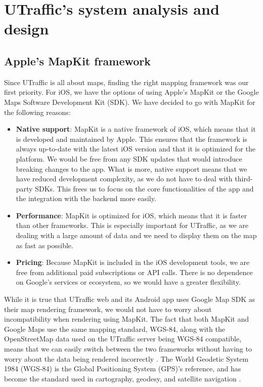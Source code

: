 \section{UTraffic's system analysis and design}

\subsection{Apple's MapKit framework}

Since UTraffic is all about maps, finding the right mapping framework was our first priority. For iOS, we have the options of using Apple's MapKit or the Google Maps Software Development Kit (SDK). We have decided to go with MapKit for the following reasons:

\begin{itemize}
    \item \textbf{Native support}: MapKit is a native framework of iOS, which means that it is developed and maintained by Apple. This ensures that the framework is always up-to-date with the latest iOS version and that it is optimized for the platform. We would be free from any SDK updates that would introduce breaking changes to the app. What is more, native support means that we have reduced development complexity, as we do not have to deal with third-party SDKs. This frees us to focus on the core functionalities of the app and the integration with the backend more easily.
    \item \textbf{Performance}: MapKit is optimized for iOS, which means that it is faster than other frameworks. This is especially important for UTraffic, as we are dealing with a large amount of data and we need to display them on the map as fast as possible.
    \item \textbf{Pricing}: Because MapKit is included in the iOS development tools, we are free from additional paid subscriptions or API calls. There is no dependence on Google's services or ecosystem, so we would have a greater flexibility.
\end{itemize}

While it is true that UTraffic web and its Android app uses Google Map SDK as their map rendering framework, we would not have to worry about incompatibility when rendering using MapKit. The fact that both MapKit and Google Maps use the same mapping standard, WGS-84, along with the OpenStreetMap data used on the UTraffic server being WGS-84 compatible, means that we can easily switch between the two frameworks without having to worry about the data being rendered incorrectly \cite{cllocationcoordinate2d} \cite{a2019_openstreetmap} \cite{google_map}. The World Geodetic System 1984 (WGS-84) is the Global Positioning System (GPS)'s reference, and has become the standard used in cartography, geodesy, and satellite navigation \cite{gisgeography_2015_world}.

